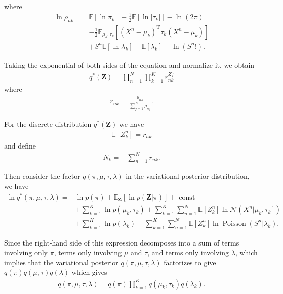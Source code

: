 \documentclass[11pt]{extarticle}
\newcommand{\E}{\mathbb{E}}
\newcommand{\N}{\mathcal{N}}
\newcommand{\Z}{\mathbf{Z}}
\newcommand{\0}{\mathbf{0}}
\renewcommand{\(}{\left(}
\renewcommand{\)}{\right)}
\DeclareMathOperator{\const}{const}
\DeclareMathOperator{\Poisson}{Poisson}
\theoremstyle{definition}
\begin{document}
where
\begin{align*}
	\ln \rho_{nk} =& \mathbb{E}\left[\ln \pi_{k}\right] + \frac{1}{2}\E\left[\ln\vert\tau_{k}\vert\right] - \ln(2\pi) \\ & - \frac{1}{2} \E_{\mu_{k}, \tau_{k}}\left[ (X^{n} - \mu_{k})^{\mathrm{T}}\tau_{k}(X^{n} - \mu_{k}) \right] \\ & + S^{n} \mathbb{E}[\ln \lambda_{k}] - \mathbb{E}[\lambda_{k}] - \ln\left(S^{n}!\right).
\end{align*}
\par Taking the exponential of both sides of the equation and normalize it, we obtain
\begin{align*}
	q^{*}(\Z) = \prod_{n=1}^{N}\prod_{k=1}^{K} r_{nk}^{Z^{n}_{k}}
\end{align*}
where
\begin{align*}
	r_{nk} = \frac{\rho_{nk}}{\sum_{j=1}^{K}\rho_{nj}}.
\end{align*}
\par For the discrete distribution $q^{*}(\Z)$ we have
\begin{align*}
	\mathbb{E}[Z^{n}_{k}] = r_{nk}
\end{align*}
and define 
\begin{align*}
	N_{k} =& \sum_{n=1}^{N} r_{nk}.
\end{align*}
\par Then consider the factor $q(\pi, \mu, \tau, \lambda)$ in the variational posterior distribution, we have
\begin{align*}
	\ln q^{*}(\pi, \mu, \tau, \lambda) =& \ln p(\pi) + \mathbb{E}_{\Z}[\ln p(\Z \vert \pi)] + \const \\ & + \sum_{k=1}^{K}\ln p(\mu_{k}, \tau_{k}) + \sum_{k=1}^{K}\sum_{n=1}^{N} \mathbb{E}[Z^{n}_{k}]\ln \N(X^{n} \vert \mu_{k}, \tau_{k}^{-1}) \\ & + \sum_{k=1}^{K}\ln p(\lambda_{k}) + \sum_{k=1}^{K}\sum_{n=1}^{N}\mathbb{E}[Z^{n}_{k}]\ln\Poisson(S^{n} \vert \lambda_{k}).
\end{align*}
\par Since the right-hand side of this expression decomposes into a sum of terms involving only $\pi$, terms only involving $\mu$ and $\tau$, and terms only involving $\lambda$, which implies that the variational posterior $q(\pi, \mu, \tau, \lambda)$ factorizes to give $q(\pi)q(\mu, \tau)q(\lambda)$ which gives
\begin{align*}
	q(\pi, \mu, \tau, \lambda) = q(\pi) \prod_{k=1}^{K} q(\mu_{k}, \tau_{k}) q(\lambda_{k}).
\end{align*}
\end{document}

